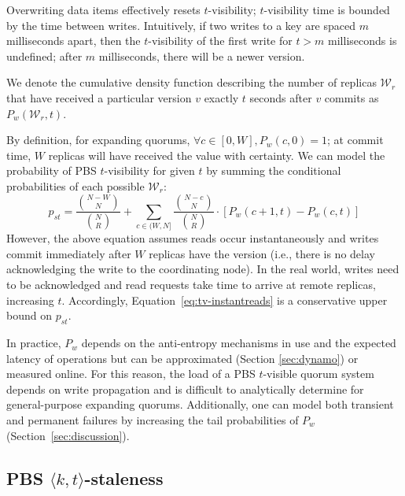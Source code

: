 \documentclass{vldb}
\newcommand{\subsectionskip}{-0em}
\begin{document}
Overwriting data items effectively resets $t$-visibility;
$t$-visibility time is bounded by the time between writes.
Intuitively, if two writes to a key are spaced $m$ milliseconds apart,
then the $t$-visibility of the first write for $t > m$ milliseconds is
undefined; after $m$ milliseconds, there will be a newer version.

We denote the cumulative density function describing the number of
replicas $\mathcal{W}_r$ that have received a particular version $v$
exactly $t$ seconds after $v$ commits as $P_w(\mathcal{W}_r, t)$.

By definition, for expanding quorums, $\forall c \in [0, W], P_w(c,0)
= 1$; at commit time, $W$ replicas will have received the value with
certainty.  We can model the probability of PBS $t$-visibility for given $t$ by summing the conditional probabilities of each possible
$\mathcal{W}_r$:
\begin{equation}
\label{eq:tv-instantreads}
p_{st} = \frac{{N-W \choose N}}{{N \choose R}}+\sum_{c\in(W, N]} \frac{{N-c \choose N}}{{N \choose R}}\cdot [P_w(c+1, t)-P_w(c,t)]
\end{equation}
However, the above equation assumes reads occur instantaneously and
writes commit immediately after $W$ replicas have the version (i.e.,
there is no delay acknowledging the write to the coordinating node).
In the real world, writes need to be acknowledged and read requests
take time to arrive at remote replicas, increasing $t$.  Accordingly,
Equation~\ref{eq:tv-instantreads} is a conservative upper bound on
$p_{st}$.

In practice, $P_w$ depends on the anti-entropy mechanisms in use and
the expected latency of operations but can be approximated (Section
\ref{sec:dynamo}) or measured online.  For this reason, the load of a
PBS $t$-visible quorum system depends on write propagation and is
difficult to analytically determine for general-purpose expanding
quorums.  Additionally, one can model both transient and permanent
failures by increasing the tail probabilities of $P_w$
(Section~\ref{sec:discussion}).


\vspace{\subsectionskip}\subsection{PBS $\langle k, t \rangle$-staleness}
\end{document}
